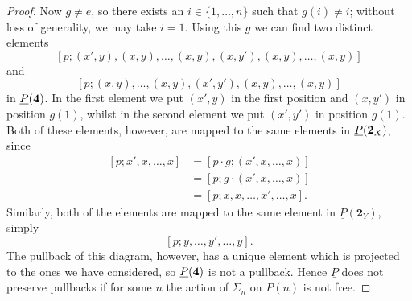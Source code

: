 \begin{proof}
Now $g \neq e$, so there exists an $i \in \{1, \ldots, n\}$ such that $g(i) \neq i$; without loss of generality, we may take $i=1$. Using this $g$ we can find two distinct elements
    \[
        \left[p;(x',y),(x,y),\ldots,(x,y),(x,y'),(x,y),\ldots,(x,y)\right]
    \]
and
    \[
        \left[p;(x,y),\ldots,(x,y),(x',y'),(x,y),\ldots,(x,y)\right]
    \]
in $\underline{P}(\mathbf{4})$. In the first element we put $(x',y)$ in the first position and $(x,y')$ in position $g(1)$, whilst in the second element we put $(x',y')$ in position $g(1)$. Both of these elements, however, are mapped to the same elements in $\underline{P}(\mathbf{2}_X)$, since
    \begin{align*}
           \left[p; x', x, \ldots, x\right]&= \left[p \cdot g; (x', x, \ldots, x)\right]\\
          &= \left[p;g\cdot (x', x, \ldots, x)\right]\\
          &= \left[p;x,x,\ldots,x',\ldots,x\right].
    \end{align*}
Similarly, both of the elements are mapped to the same element in $\underline{P}(\mathbf{2}_Y)$, simply
    \[
        \left[p;y,\ldots,y', \ldots, y\right].
    \]
The pullback of this diagram, however, has a unique element which is projected to the ones we have considered, so $\underline{P}(\mathbf{4})$ is not a pullback. Hence $\underline{P}$ does not preserve pullbacks if for some $n$ the action of $\Sigma_n$ on $P(n)$ is not free.


\end{proof}
